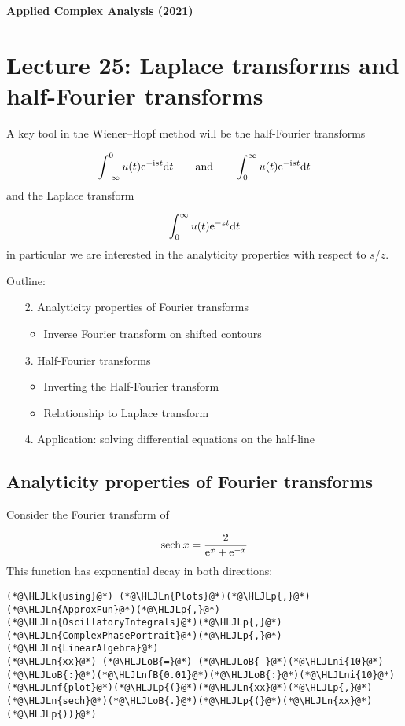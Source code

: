 \documentclass[12pt,landscape]{article}
\newcommand{\HLJLk}[1]{\textcolor[RGB]{148,91,176}{\textbf{#1}}}
\newcommand{\HLJLn}[1]{#1}
\newcommand{\HLJLnf}[1]{\textcolor[RGB]{66,102,213}{#1}}
\newcommand{\HLJLnfB}[1]{\textcolor[RGB]{59,151,46}{#1}}
\newcommand{\HLJLni}[1]{\textcolor[RGB]{59,151,46}{#1}}
\newcommand{\HLJLoB}[1]{\textcolor[RGB]{102,102,102}{\textbf{#1}}}
\newcommand{\HLJLp}[1]{#1}
\def\qqand{\qquad\hbox{and}\qquad}
\def\D{ {\rm d} }
\def\I{ {\rm i} }
\def\E{ {\rm e} }
\def\sech{ {\rm sech}\, }
\def\dt{\D t}
\def\endash{–}
\begin{document}
{\LARGE
\sf
\textbf{Applied Complex Analysis (2021)}

\section{Lecture 25: Laplace transforms and half-Fourier transforms}
A key tool in the Wiener\ensuremath{\endash}Hopf method will be the half-Fourier transforms

\[
\int_{-\infty}^0 u(t) \E^{-\I s t} \dt \qqand \int_0^\infty u(t) \E^{-\I s t} \dt
\]
and the Laplace transform

\[
\int_0^\infty u(t) \E^{-z t} \dt
\]
in particular we are interested in the analyticity properties with respect to $s$/$z$.

Outline:

\begin{itemize}
\item[2. ] Analyticity properties of Fourier transforms

\begin{itemize}
\item Inverse Fourier transform on shifted contours

\end{itemize}

\item[3. ] Half-Fourier transforms

\begin{itemize}
\item Inverting the Half-Fourier transform


\item Relationship to Laplace transform

\end{itemize}

\item[4. ] Application: solving differential equations on the half-line

\end{itemize}
\subsection{Analyticity properties of Fourier transforms}
Consider the Fourier transform of

\[
\sech x = {2 \over \E^x + \E^{-x}}
\]
This function has exponential decay in both directions:


\begin{lstlisting}
(*@\HLJLk{using}@*) (*@\HLJLn{Plots}@*)(*@\HLJLp{,}@*) (*@\HLJLn{ApproxFun}@*)(*@\HLJLp{,}@*) (*@\HLJLn{OscillatoryIntegrals}@*)(*@\HLJLp{,}@*) (*@\HLJLn{ComplexPhasePortrait}@*)(*@\HLJLp{,}@*) (*@\HLJLn{LinearAlgebra}@*)
(*@\HLJLn{xx}@*) (*@\HLJLoB{=}@*) (*@\HLJLoB{-}@*)(*@\HLJLni{10}@*)(*@\HLJLoB{:}@*)(*@\HLJLnfB{0.01}@*)(*@\HLJLoB{:}@*)(*@\HLJLni{10}@*)
(*@\HLJLnf{plot}@*)(*@\HLJLp{(}@*)(*@\HLJLn{xx}@*)(*@\HLJLp{,}@*)(*@\HLJLn{sech}@*)(*@\HLJLoB{.}@*)(*@\HLJLp{(}@*)(*@\HLJLn{xx}@*)(*@\HLJLp{))}@*)
\end{lstlisting}

}
\end{document}
